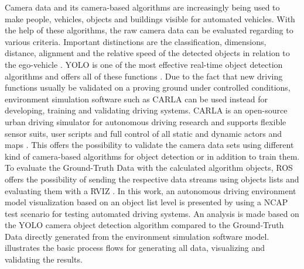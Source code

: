 Camera data and its camera-based algorithms are increasingly being used to make people, vehicles, objects and buildings visible for automated vehicles. With the help of these algorithms, the raw camera data can be evaluated regarding to various criteria. Important distinctions are the classification, dimensions, distance, alignment and the relative speed of the detected objects in relation to the ego-vehicle \cite{Aeberhard}. \ac{YOLO} is one of the most effective real-time object detection algorithms and offers all of these functions \cite{knuthwebsite}.
Due to the fact that new driving functions usually be validated on a proving ground under controlled conditions, environment simulation software such as CARLA can be used instead for developing, training and validating driving systems\cite{Gap}. CARLA is an open-source urban driving simulator for autonomous driving research and supports flexible sensor suits, user scripts and full control of all static and dynamic actors and maps \cite{Dosovitskiy17}. This offers the possibility to validate the camera data sets using different kind of camera-based algorithms for object detection or in addition to train them. To evaluate the Ground-Truth Data with the calculated algorithm objects, \ac{ROS} offers the possibility of sending the respective data streams using objects lists and evaluating them with a \ac{RVIZ} \cite{ROS}.
In this work, an autonomous driving environment model visualization based on an object list level is presented by using a NCAP test scenario for testing automated driving systems. An analysis is made based on the \ac{YOLO} camera object detection algorithm compared to the Ground-Truth Data directly generated from the environment simulation software model.  illustrates the basic process flows for generating all data, visualizing and validating the results.




